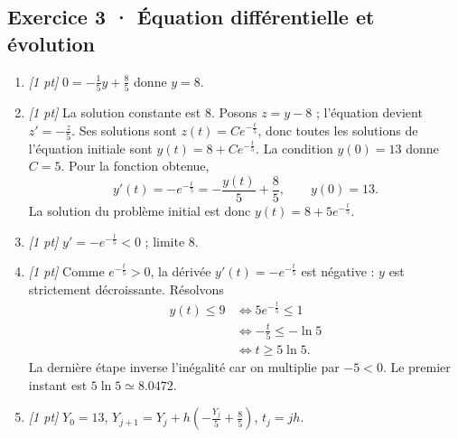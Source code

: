 \subsection*{Exercice 3 · Équation différentielle et évolution}\begin{enumerate}

\item \textit{[1 pt]} $0=-\frac{1}{5}y+\frac{8}{5}$ donne $y=8$.

\item \textit{[1 pt]} La solution constante est $8$. Posons $z=y-8$ ; l'équation devient $z'=-\frac{z}{5}$. Ses solutions sont $z(t)=Ce^{-\frac{t}{5}}$, donc toutes les solutions de l'équation initiale sont $y(t)=8+Ce^{-\frac{t}{5}}$.
La condition $y(0)=13$ donne $C=5$. Pour la fonction obtenue,
\[y'(t)=-e^{-\frac{t}{5}}=-\frac{y(t)}{5}+\frac{8}{5},\qquad y(0)=13.\]
La solution du problème initial est donc $y(t)=8+5e^{-\frac{t}{5}}$.

\item \textit{[1 pt]} $y'=-e^{-\frac{t}{5}}<0$ ; limite $8$.

\item \textit{[1 pt]} Comme $e^{-\frac{t}{5}}>0$, la dérivée $y'(t)=-e^{-\frac{t}{5}}$ est négative : $y$ est strictement décroissante. Résolvons
\[\begin{aligned}y(t)\le 9&\Longleftrightarrow 5e^{-\frac{t}{5}}\le1\\&\Longleftrightarrow -\frac{t}{5}\le-\ln 5\\&\Longleftrightarrow t\ge 5\ln 5.\end{aligned}\]
La dernière étape inverse l'inégalité car on multiplie par $-5<0$. Le premier instant est $5\ln 5\simeq\num{8,0472}$.

\item \textit{[1 pt]} $Y_0=13$, $Y_{j+1}=Y_j+h(-\frac{Y_j}{5}+\frac{8}{5})$, $t_j=jh$.

\end{enumerate}

